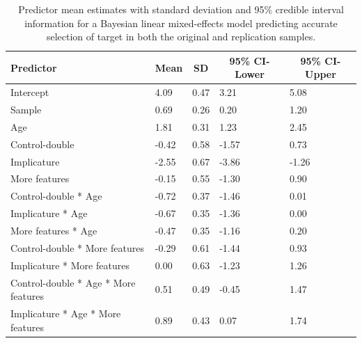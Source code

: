 \documentclass[man]{apa6}
\begin{document}
\begin{table}[tbp]
\begin{center}
\begin{threeparttable}
\caption{\label{tab:brmacc}Predictor mean estimates with standard deviation and 95\% credible interval information for a Bayesian linear mixed-effects model predicting accurate selection of target in both the original and replication samples.}
\begin{tabular}{lllll}
\toprule
Predictor & \multicolumn{1}{c}{Mean} & \multicolumn{1}{c}{SD} & \multicolumn{1}{c}{95\% CI-Lower} & \multicolumn{1}{c}{95\% CI-Upper}\\
\midrule
Intercept & 4.09 & 0.47 & 3.21 & 5.08\\
Sample & 0.69 & 0.26 & 0.20 & 1.20\\
Age & 1.81 & 0.31 & 1.23 & 2.45\\
Control-double & -0.42 & 0.58 & -1.57 & 0.73\\
Implicature & -2.55 & 0.67 & -3.86 & -1.26\\
More features & -0.15 & 0.55 & -1.30 & 0.90\\
Control-double * Age & -0.72 & 0.37 & -1.46 & 0.01\\
Implicature * Age & -0.67 & 0.35 & -1.36 & 0.00\\
More features * Age & -0.47 & 0.35 & -1.16 & 0.20\\
Control-double * More features & -0.29 & 0.61 & -1.44 & 0.93\\
Implicature * More features & 0.00 & 0.63 & -1.23 & 1.26\\
Control-double * Age * More features & 0.51 & 0.49 & -0.45 & 1.47\\
Implicature * Age * More features & 0.89 & 0.43 & 0.07 & 1.74\\
\bottomrule
\end{tabular}
\end{threeparttable}
\end{center}
\end{table}
\end{document}
